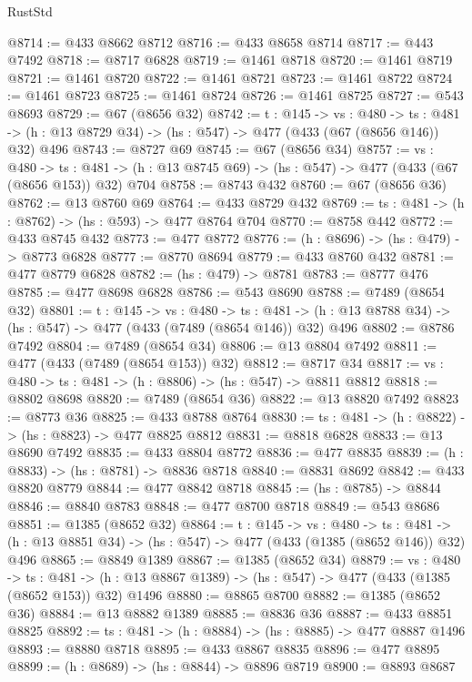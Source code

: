 \begin{lexlean}{RustStd}
\begin{coremodule}
@8714 := @433 @8662 @8712
@8716 := @433 @8658 @8714
@8717 := @443 @7492
@8718 := @8717 @6828
@8719 := @1461 @8718
@8720 := @1461 @8719
@8721 := @1461 @8720
@8722 := @1461 @8721
@8723 := @1461 @8722
@8724 := @1461 @8723
@8725 := @1461 @8724
@8726 := @1461 @8725
@8727 := @543 @8693
@8729 := @67 (@8656 @32)
@8742 := {t : @145} ->
  {vs : @480} ->
  {ts : @481} -> (h : @13 @8729 @34) -> (hs : @547) -> @477 (@433 (@67 (@8656 @146)) @32) @496
@8743 := @8727 @69
@8745 := @67 (@8656 @34)
@8757 := {vs : @480} ->
  {ts : @481} -> (h : @13 @8745 @69) -> (hs : @547) -> @477 (@433 (@67 (@8656 @153)) @32) @704
@8758 := @8743 @432
@8760 := @67 (@8656 @36)
@8762 := @13 @8760 @69
@8764 := @433 @8729 @432
@8769 := {ts : @481} -> (h : @8762) -> (hs : @593) -> @477 @8764 @704
@8770 := @8758 @442
@8772 := @433 @8745 @432
@8773 := @477 @8772
@8776 := (h : @8696) -> (hs : @479) -> @8773 @6828
@8777 := @8770 @8694
@8779 := @433 @8760 @432
@8781 := @477 @8779 @6828
@8782 := (hs : @479) -> @8781
@8783 := @8777 @476
@8785 := @477 @8698 @6828
@8786 := @543 @8690
@8788 := @7489 (@8654 @32)
@8801 := {t : @145} ->
  {vs : @480} ->
  {ts : @481} -> (h : @13 @8788 @34) -> (hs : @547) -> @477 (@433 (@7489 (@8654 @146)) @32) @496
@8802 := @8786 @7492
@8804 := @7489 (@8654 @34)
@8806 := @13 @8804 @7492
@8811 := @477 (@433 (@7489 (@8654 @153)) @32)
@8812 := @8717 @34
@8817 := {vs : @480} -> {ts : @481} -> (h : @8806) -> (hs : @547) -> @8811 @8812
@8818 := @8802 @8698
@8820 := @7489 (@8654 @36)
@8822 := @13 @8820 @7492
@8823 := @8773 @36
@8825 := @433 @8788 @8764
@8830 := {ts : @481} -> (h : @8822) -> (hs : @8823) -> @477 @8825 @8812
@8831 := @8818 @6828
@8833 := @13 @8690 @7492
@8835 := @433 @8804 @8772
@8836 := @477 @8835
@8839 := (h : @8833) -> (hs : @8781) -> @8836 @8718
@8840 := @8831 @8692
@8842 := @433 @8820 @8779
@8844 := @477 @8842 @8718
@8845 := (hs : @8785) -> @8844
@8846 := @8840 @8783
@8848 := @477 @8700 @8718
@8849 := @543 @8686
@8851 := @1385 (@8652 @32)
@8864 := {t : @145} ->
  {vs : @480} ->
  {ts : @481} -> (h : @13 @8851 @34) -> (hs : @547) -> @477 (@433 (@1385 (@8652 @146)) @32) @496
@8865 := @8849 @1389
@8867 := @1385 (@8652 @34)
@8879 := {vs : @480} ->
  {ts : @481} -> (h : @13 @8867 @1389) -> (hs : @547) -> @477 (@433 (@1385 (@8652 @153)) @32) @1496
@8880 := @8865 @8700
@8882 := @1385 (@8652 @36)
@8884 := @13 @8882 @1389
@8885 := @8836 @36
@8887 := @433 @8851 @8825
@8892 := {ts : @481} -> (h : @8884) -> (hs : @8885) -> @477 @8887 @1496
@8893 := @8880 @8718
@8895 := @433 @8867 @8835
@8896 := @477 @8895
@8899 := (h : @8689) -> (hs : @8844) -> @8896 @8719
@8900 := @8893 @8687

\end{coremodule}
\end{lexlean}

